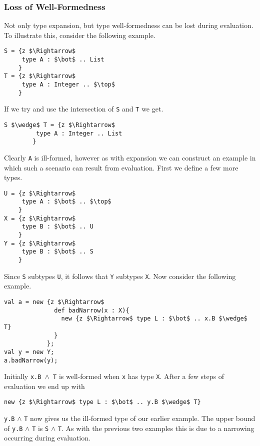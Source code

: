 \documentclass[11pt
              , a4paper
              , twoside
              , openright
              ]{report}
\numberwithin{case}{theorem}
\numberwithin{subcase}{case}
\begin{document}
\subsubsection{Loss of Well-Formedness}
Not only type expansion, but type well-formedness can be lost during evaluation. To illustrate this, consider the following example.
\begin{lstlisting}[mathescape, style=customlang]
S = {z $\Rightarrow$
     type A : $\bot$ .. List
    }
T = {z $\Rightarrow$
     type A : Integer .. $\top$
    }
\end{lstlisting}
If we try and use the intersection of \texttt{S} and \texttt{T} we get. 
\begin{lstlisting}[mathescape, style=customlang]
S $\wedge$ T = {z $\Rightarrow$
         type A : Integer .. List
        }
\end{lstlisting}
Clearly \verb|A| is ill-formed, however as with expansion we can construct an example in which such a scenario can result from evaluation. First we define a few more types.
\begin{lstlisting}[mathescape, style=customlang]
U = {z $\Rightarrow$
     type A : $\bot$ .. $\top$
    }
X = {z $\Rightarrow$
     type B : $\bot$ .. U
    }
Y = {z $\Rightarrow$
     type B : $\bot$ .. S
    }
\end{lstlisting}
Since \texttt{S} subtypes \texttt{U}, it follows that \texttt{Y} subtypes \texttt{X}. Now consider the following example.
\begin{lstlisting}[mathescape, style=customlang]
val a = new {z $\Rightarrow$
              def badNarrow(x : X){
                new {z $\Rightarrow$ type L : $\bot$ .. x.B $\wedge$ T}
              }
            };
val y = new Y;
a.badNarrow(y);
\end{lstlisting}
Initially \texttt{x.B $\wedge$ T} is well-formed when \texttt{x} has type \texttt{X}. After a few steps of evaluation we end up with 
\begin{lstlisting}[mathescape, style=customlang]
new {z $\Rightarrow$ type L : $\bot$ .. y.B $\wedge$ T}
\end{lstlisting}
\verb|y.B| $\wedge$ \verb|T| now gives us the ill-formed type of our earlier example. The upper bound of \verb|y.B| $\wedge$ \verb|T| is \verb|S| $\wedge$ \verb|T|. As with the previous two examples this is due to a narrowing occurring during evaluation.
\end{document}
